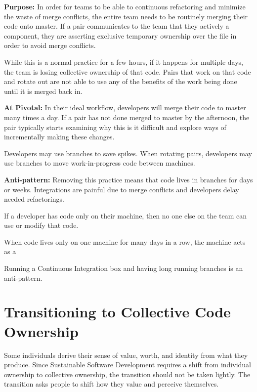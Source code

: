\begin{table}[]
\textbf{Purpose:} In order for teams to be able to continuous refactoring and minimize the waste of merge conflicts, the entire team needs to be routinely merging their code onto master.  If a pair communicates to the team that they actively  a component, they are asserting exclusive temporary ownership over the file in order to avoid merge conflicts. 

While this is a normal practice for a few hours, if it happens for multiple days, the team is losing collective ownership of that code. Pairs that work on that code and rotate out are not able to use any of the benefits of the work being done until it is merged back in. 

\textbf{At Pivotal:} In their ideal workflow, developers will merge their code to master many times a day. If a pair has not done merged to master by the afternoon, the pair typically starts examining why this is it difficult and explore ways of incrementally making these changes. 

Developers may use branches to save spikes. When rotating pairs, developers may use branches to move work-in-progress code between machines.  

\textbf{Anti-pattern:} Removing this practice means that code lives in branches for days or weeks. Integrations are painful due to merge conflicts and developers delay needed refactorings.

If a developer has code only on their machine, then no one else on the team can use or modify that code. 

When code lives only on one machine for many days in a row, the machine acts as a  

Running a Continuous Integration box and having long running branches is an anti-pattern.


\section{Transitioning to Collective Code Ownership}
\label{Transitioning}
Some individuals derive their sense of value, worth, and identity from what they produce. Since Sustainable Software Development requires a shift from individual ownership to collective ownership, the transition should not be taken lightly. The transition asks people to shift how they value and perceive themselves. 


\end{table}
